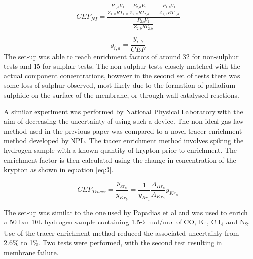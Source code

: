 \begin{equation} \label{eq:1}
    CEF_{NI} = \frac{\frac{P_{1,a} V_1}{Z_{1,a}RT_{1,a}}\frac{P_{2,a} V_2}{Z_{2,a}RT_{2,a}}-\frac{P_{1,b} V_1}{Z_{1,b}RT_{1,b}}}{\frac{P_{2,b} V_2}{Z_{2,b}RT_{2,b}}}
\end{equation}

\begin{equation}\label{eq:2}
    y_{i,a} = \frac{y_{i,b}}{CEF}
\end{equation}
The set-up was able to reach enrichment factors of around 32 for non-sulphur tests and 15 
for sulphur tests. The non-sulphur tests closely matched with the actual component concentrations, 
however in the second set of tests there was some loss of sulphur observed, most likely due to the 
formation of palladium sulphide on the surface of the membrane, or through wall catalysed reactions. 

A similar experiment was performed by National Physical Laboratory with the aim of decreasing the uncertainty 
of using such a device. \cite{Murugan2014} The non-ideal gas law method used in the previous paper \cite{Ahmed2010} 
was compared to a novel tracer enrichment method developed by NPL. \cite{Murugan2014} 
The tracer enrichment method involves spiking the hydrogen sample with a known quantity of krypton prior to 
enrichment. The enrichment factor is then calculated using the change in concentration of the krypton as 
shown in equation \ref{eq:3}.

\begin{equation} \label{eq:3}
    CEF_{Tracer} = \frac{y_{kr_b}}{y_{Kr_b}} = \frac{1}{y_{Kr_a}} \frac{A_{Kr_b}}{A_{Kr_a}} y_{Kr_{st}}
\end{equation}

The set-up was similar to the one used by Papadias et al \cite{Ahmed2010} and was used to enrich a 50 bar 10L hydrogen sample 
containing 1.5-2 \textmu mol/mol of CO, Kr, CH\textsubscript{4} and N\textsubscript{2}. Use of the tracer enrichment 
method reduced the associated uncertainty from 2.6\% to 1\%. 
Two tests were performed, with the second test resulting in membrane failure. 

